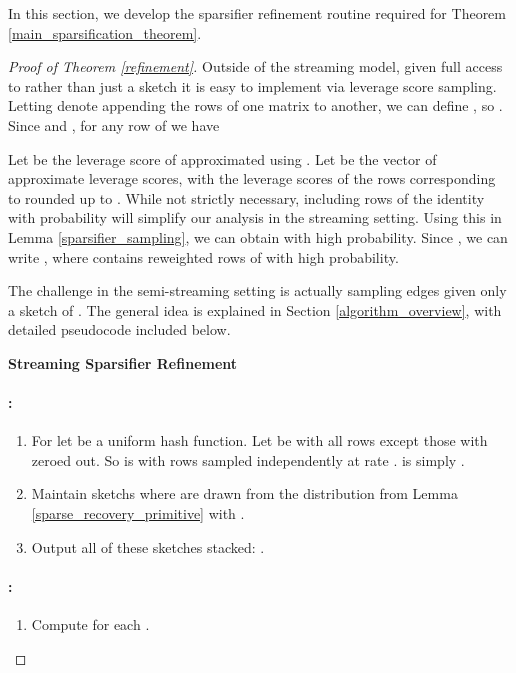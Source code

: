 \documentclass[11pt]{article}
\begin{document}
In this section, we develop the sparsifier refinement routine required for Theorem \ref{main_sparsification_theorem}.

\begin{proof}[Proof of Theorem \ref{refinement}]

Outside of the streaming model, given full access to  rather than just a sketch  it is easy to implement  via leverage score sampling. Letting  denote appending the rows of one matrix to another, we can define , so . Since  and , for any row of  we have


Let  be the leverage score of  approximated using . Let  be the vector of approximate leverage scores, with the leverage scores of the  rows corresponding to  rounded up to . While not strictly necessary, including rows of the identity with probability  will simplify our analysis in the streaming setting. Using this  in Lemma \ref{sparsifier_sampling}, we can obtain  with high probability. Since , we can write  , where  contains  reweighted rows of  with high probability.

The challenge in the semi-streaming setting is actually sampling edges given only a sketch of . The general idea is explained in Section \ref{algorithm_overview}, with detailed pseudocode included below. 
\begin{framed}{\noindent\bfseries Streaming Sparsifier Refinement}


\paragraph{:}
\begin{enumerate}

\item For  let  be a uniform hash function. Let  be  with all rows except those with  zeroed out. So  is  with rows sampled independently at rate .  is simply .  

\item Maintain sketchs  where  are drawn from the distribution from Lemma \ref{sparse_recovery_primitive} with .
\item Output all of these sketches stacked: .

\end{enumerate}

\paragraph{:}
\begin{enumerate}
\item Compute  for each .


\end{enumerate}
\end{framed}
\end{proof}
\end{document}
